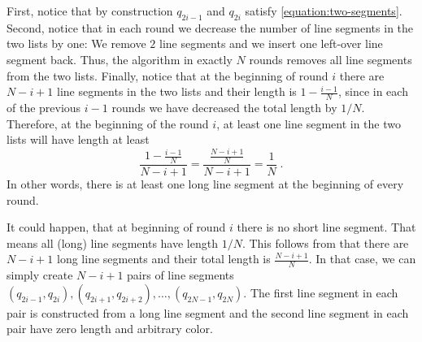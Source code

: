 \documentclass{article}
\begin{document}
First, notice that by construction $q_{2i-1}$ and $q_{2i}$ satisfy
\eqref{equation:two-segments}.  Second, notice that in each round we decrease
the number of line segments in the two lists by one: We remove $2$ line
segments and we insert one left-over line segment back. Thus, the algorithm in
exactly $N$ rounds removes all line segments from the two lists. Finally,
notice that at the beginning of round $i$ there are $N-i+1$ line segments in
the two lists and their length is $1 - \frac{i-1}{N}$, since in each of the
previous $i-1$ rounds we have decreased the total length by $1/N$. Therefore,
at the beginning of the round $i$, at least one line segment in the two lists
will have length at least
$$
\frac{1 - \frac{i-1}{N}}{N - i + 1}
= \frac{\frac{N - i + 1}{N}}{N - i + 1}
= \frac{1}{N} \; .
$$
In other words, there is at least one long line segment at the beginning of
every round.

It could happen, that at beginning of round $i$ there is no short line segment.
That means all (long) line segments have length $1/N$. This follows from that
there are $N-i+1$ long line segments and their total length is
$\frac{N-i+1}{N}$. In that case, we can simply create $N-i+1$ pairs of line
segments $(q_{2i-1}, q_{2i}), (q_{2i+1}, q_{2i+2}), \dots, (q_{2N-1}, q_{2N})$.
The first line segment in each pair is constructed from a long line segment and
the second line segment in each pair have zero length and arbitrary color.



\end{document}
